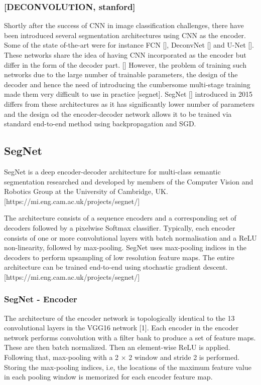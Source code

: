 \subsubsection{[DECONVOLUTION, stanford]}

Shortly after the success of CNN in image classification challenges, there have been introduced several segmentation architectures using CNN as the encoder. Some of the state of-the-art were for instance FCN [], DeconvNet [] and U-Net []. These networks share the idea of having CNN incorporated as the encoder but differ in the form
of the decoder part. [] However, the problem of training such networks due to the large number of trainable parameters, the design of the decoder and hence the need of introducing the cumbersome multi-stage training made them very difficult to use in practice [segnet]. SegNet [] introduced in 2015 differs from these architectures as it has significantly lower number of parameters and the design od the encoder-decoder network allows it to be trained via standard end-to-end method using backpropagation and SGD. 

\subsection{SegNet}

SegNet is a deep encoder-decoder architecture for multi-class semantic segmentation researched and developed by members of the Computer Vision and Robotics Group at the University of Cambridge, UK. [https://mi.eng.cam.ac.uk/projects/segnet/]

The architecture consists of a sequence encoders and a corresponding set of decoders followed by a pixelwise Softmax classifier. Typically, each encoder consists of one or more convolutional layers with batch normalisation and a ReLU non-linearity, followed by max-pooling. SegNet uses max-pooling indices in the decoders to perform upsampling of low resolution feature maps. The entire architecture can be trained end-to-end using stochastic gradient descent.  [https://mi.eng.cam.ac.uk/projects/segnet/]

\subsubsection{SegNet - Encoder}

The architecture of the encoder network is topologically identical to the 13 convolutional layers in the
VGG16 network [1]. Each encoder in the encoder network performs convolution with a filter bank to produce a set of feature maps. These are then batch normalized. Then an element-wise ReLU is applied. Following that, max-pooling with a 2 × 2 window and stride 2 is performed. Storing the max-pooling indices, i.e, the locations of the maximum feature value in each pooling window is memorized for each encoder feature map.

